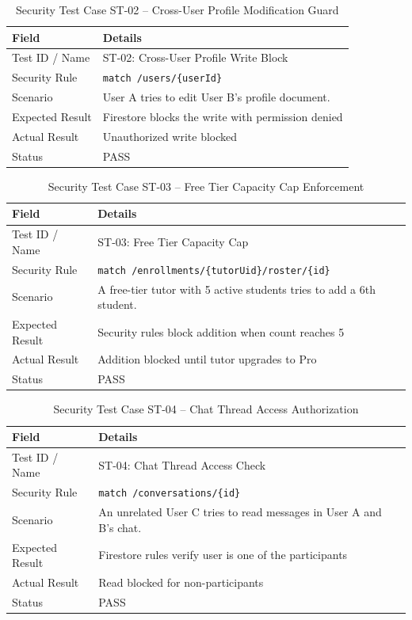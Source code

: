 \documentclass[12pt]{report}
\begin{document}
\begin{table}[H]
\centering
\caption{Security Test Case ST-02 -- Cross-User Profile Modification Guard}
\label{tab:st02}
\small
\begin{tabular}{|p{3.2cm}|p{11.5cm}|}
\hline
\textbf{Field} & \textbf{Details} \\
\hline
Test ID / Name & ST-02: Cross-User Profile Write Block \\
\hline
Security Rule & \texttt{match /users/\{userId\}} \\
\hline
Scenario & User A tries to edit User B's profile document. \\
\hline
Expected Result & Firestore blocks the write with permission denied \\
\hline
Actual Result & Unauthorized write blocked \\
\hline
Status & PASS \\
\hline
\end{tabular}
\end{table}

\begin{table}[H]
\centering
\caption{Security Test Case ST-03 -- Free Tier Capacity Cap Enforcement}
\label{tab:st03}
\small
\begin{tabular}{|p{3.2cm}|p{11.5cm}|}
\hline
\textbf{Field} & \textbf{Details} \\
\hline
Test ID / Name & ST-03: Free Tier Capacity Cap \\
\hline
Security Rule & \texttt{match /enrollments/\{tutorUid\}/roster/\{id\}} \\
\hline
Scenario & A free-tier tutor with 5 active students tries to add a 6th student. \\
\hline
Expected Result & Security rules block addition when count reaches 5 \\
\hline
Actual Result & Addition blocked until tutor upgrades to Pro \\
\hline
Status & PASS \\
\hline
\end{tabular}
\end{table}

\begin{table}[H]
\centering
\caption{Security Test Case ST-04 -- Chat Thread Access Authorization}
\label{tab:st04}
\small
\begin{tabular}{|p{3.2cm}|p{11.5cm}|}
\hline
\textbf{Field} & \textbf{Details} \\
\hline
Test ID / Name & ST-04: Chat Thread Access Check \\
\hline
Security Rule & \texttt{match /conversations/\{id\}} \\
\hline
Scenario & An unrelated User C tries to read messages in User A and B's chat. \\
\hline
Expected Result & Firestore rules verify user is one of the participants \\
\hline
Actual Result & Read blocked for non-participants \\
\hline
Status & PASS \\
\hline
\end{tabular}
\end{table}
\end{document}
